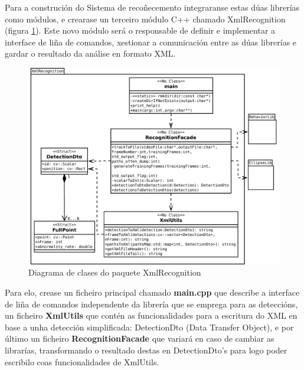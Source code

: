             Para a construción do Sistema de recoñecemento integraranse estas dúas librerías como módulos, e 
            crearase un terceiro módulo C++ chamado XmlRecognition (figura \ref{fig:PaqXmlRecognition}).
            Este novo módulo será o responsable de definir e implementar a interface de liña de 
            comandos, xestionar a comunicación entre as dúas librerías e gardar o resultado da análise
            en formato XML.
            
            \begin{figure}[htp]
            \begin{center}
                \includegraphics[scale=0.4]{figures/PaqXmlRecognition.pdf}
                \caption{Diagrama de clases do paquete XmlRecognition}
            \label{fig:PaqXmlRecognition}
            \end{center}
            \end{figure}
            
            Para elo, crease un ficheiro principal chamado \textbf{main.cpp} que describe a interface de liña de comandos
            independente da librería que se emprega para as deteccións, un ficheiro \textbf{XmlUtils} que contén as
            funcionalidades para a escritura do XML en base a unha detección simplificada: DetectionDto 
            (Data Transfer Object), e por último un ficheiro \textbf{RecognitionFacade} que variará en 
            caso de cambiar as librarías, transformando o resultado destas en DetectionDto's para logo
            poder escribilo coas funcionalidades de XmlUtils.
            
